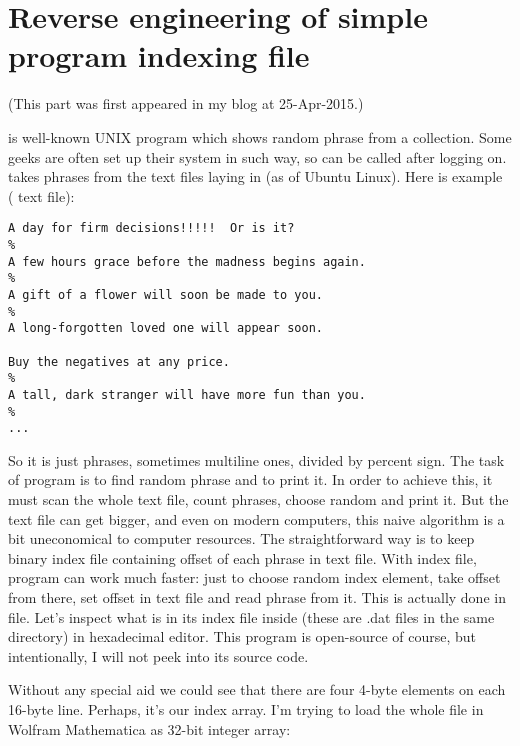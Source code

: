 \section[\IT{fortune} program indexing file]{Reverse engineering of simple  program indexing file}

(This part was first appeared in my blog at 25-Apr-2015.)

 is well-known UNIX program which shows random phrase from a collection.
Some geeks are often set up their system in such way, so  can be called after logging on.
 takes phrases from the text files laying in  (as of Ubuntu Linux).
Here is example ( text file):

\begin{lstlisting}
A day for firm decisions!!!!!  Or is it?
%
A few hours grace before the madness begins again.
%
A gift of a flower will soon be made to you.
%
A long-forgotten loved one will appear soon.

Buy the negatives at any price.
%
A tall, dark stranger will have more fun than you.
%
...
\end{lstlisting}

So it is just phrases, sometimes multiline ones, divided by percent sign.
The task of  program is to find random phrase and to print it.
In order to achieve this, it must scan the whole text file, count phrases, choose random and print it.
But the text file can get bigger, and even on modern computers, this naive algorithm is a bit uneconomical to computer resources.
The straightforward way is to keep binary index file containing offset of each phrase in text file.
With index file,  program can work much faster: just to choose random index element, take offset from there, set offset in text file and read phrase from it.
This is actually done in  file.
Let's inspect what is in its index file inside (these are .dat files in the same directory) in hexadecimal editor.
This program is open-source of course, but intentionally, I will not peek into its source code.



Without any special aid we could see that there are four 4-byte elements on each 16-byte line.
Perhaps, it's our index array.
I'm trying to load the whole file in Wolfram Mathematica as 32-bit integer array:

